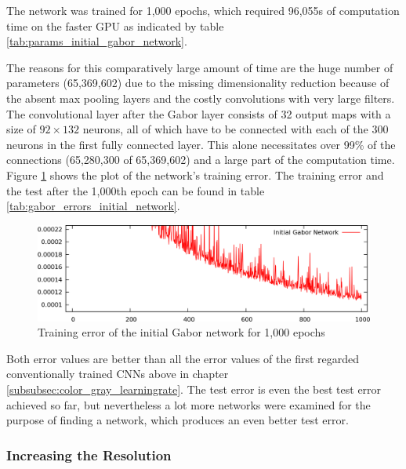 \documentclass[11pt, a4paper]{article}
\begin{document}


The network was trained for 1,000 epochs, which required 96,055s of computation time on the faster \ac{GPU} as indicated by table \ref{tab:params_initial_gabor_network}. 

The reasons for this comparatively large amount of time are the huge number of parameters (65,369,602) due to the missing dimensionality reduction because of the absent max pooling layers and the costly convolutions with very large filters. The convolutional layer after the Gabor layer consists of 32 output maps with a size of $92 \times 132$ neurons, all of which have to be connected with each of the 300 neurons in the first fully connected layer. This alone necessitates over 99\% of the connections (65,280,300 of 65,369,602) and a large part of the computation time.
Figure \ref{fig:gabor_initial_network} shows the plot of the network's training error. The training error and the test after the 1,000th epoch can be found in table \ref{tab:gabor_errors_initial_network}.

\begin{figure}[h!]
	\centering
	\includegraphics[width=\textwidth]{images/results/gabor_initial_network.png}
	\caption{Training error of the initial Gabor network for 1,000 epochs}
	\label{fig:gabor_initial_network}
\end{figure}



Both error values are better than all the error values of the first regarded conventionally trained \acp{CNN} above in chapter \ref{subsubsec:color_gray_learningrate}. The test error is even the best test error achieved so far, but nevertheless a lot more networks were examined for the purpose of finding a network, which produces an even better test error.

\subsubsection{Increasing the Resolution}
\end{document}
